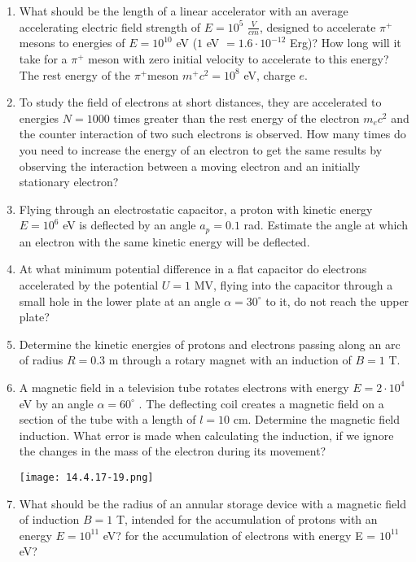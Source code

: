 \documentclass{article}
\begin{document}
\begin{enumerate}[label=14.4.\arabic*]
\item What should be the length of a linear accelerator with an average accelerating electric field strength of $E = 10^5$ $\frac{V}{cm}$, designed to accelerate $\pi^+$mesons to energies of $E = 10^{10}$ eV ($1$ eV $= 1.6 \cdot 10^{-12}$ Erg)? How long will it take for a $\pi^+$ meson with zero initial velocity to accelerate to this energy? The rest energy of the $\pi^+$meson $m^+ c^2 = 10^8$ eV, charge $e$.

\item To study the field of electrons at short distances, they are accelerated to energies $N = 1000$ times greater than the rest energy of the electron $m_e c^2$ and the counter interaction of two such electrons is observed. How many times do you need to increase the energy of an electron to get the same results by observing the interaction between a moving electron and an initially stationary electron?

\item Flying through an electrostatic capacitor, a proton with kinetic energy $E = 10^6$ eV is deflected by an angle $a_p = 0.1$ rad. Estimate the angle at which an electron with the same kinetic energy will be deflected.

\item At what minimum potential difference in a flat capacitor do electrons accelerated by the potential $U = 1$ MV, flying into the capacitor through a small hole in the lower plate at an angle $\alpha = 30^\circ$ to it, do not reach the upper plate?

\item Determine the kinetic energies of protons and electrons passing along an arc of radius $R = 0.3$ m through a rotary magnet with an induction of $B = 1$ T.

\item A magnetic field in a television tube rotates electrons with energy $E = 2 \cdot 10^4$ eV by an angle $\alpha = 60^\circ$ . The deflecting coil creates a magnetic field on a section of the tube with a length of $l = 10$ cm. Determine the magnetic field induction. What error is made when calculating the induction, if we ignore the changes in the mass of the electron during its movement?

\begin{center}
    \texttt{[image: 14.4.17-19.png]}
\end{center}

\item What should be the radius of an annular storage device with a magnetic field of induction $B = 1$ T, intended for the accumulation of protons with an energy $E = 10^{11}$ eV? for the accumulation of electrons with energy E = $10^{11}$ eV?


\end{enumerate}
\end{document}
